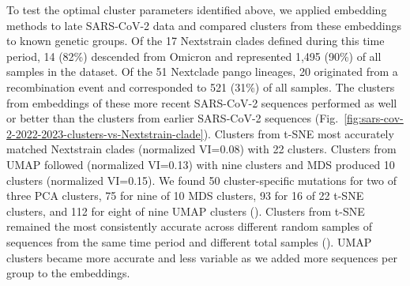 \documentclass[10pt,letterpaper]{article}
\begin{document}
To test the optimal cluster parameters identified above, we applied embedding methods to late SARS-CoV-2 data and compared clusters from these embeddings to known genetic groups.
Of the 17 Nextstrain clades defined during this time period, 14 (82\%) descended from Omicron and represented 1,495 (90\%) of all samples in the dataset.
Of the 51 Nextclade pango lineages, 20 originated from a recombination event and corresponded to 521 (31\%) of all samples.
The clusters from embeddings of these more recent SARS-CoV-2 sequences performed as well or better than the clusters from earlier SARS-CoV-2 sequences (Fig.~\ref{fig:sars-cov-2-2022-2023-clusters-vs-Nextstrain-clade}).
Clusters from t-SNE most accurately matched Nextstrain clades (normalized VI=0.08) with 22 clusters.
Clusters from UMAP followed (normalized VI=0.13) with nine clusters and MDS produced 10 clusters (normalized VI=0.15).
We found 50 cluster-specific mutations for two of three PCA clusters, 75 for nine of 10 MDS clusters, 93 for 16 of 22 t-SNE clusters, and 112 for eight of nine UMAP clusters ().
Clusters from t-SNE remained the most consistently accurate across different random samples of sequences from the same time period and different total samples ().
UMAP clusters became more accurate and less variable as we added more sequences per group to the embeddings.
\end{document}
